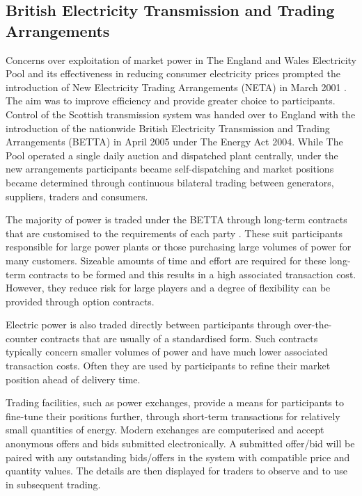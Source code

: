 \subsection{British Electricity Transmission and Trading Arrangements}
\label{sec:betta}
Concerns over exploitation of market power in The England and Wales Electricity
Pool and its effectiveness in reducing consumer electricity prices prompted the
introduction of New Electricity Trading Arrangements (NETA) in March 2001
\cite{martoccia:2005}.  The aim was to improve efficiency and provide greater
choice to participants.  Control of the Scottish transmission system was
handed over to England with the introduction of the nationwide British
Electricity Transmission and Trading Arrangements (BETTA) in April 2005 under
The Energy Act 2004.  While The Pool operated a single daily auction and dispatched plant
centrally, under the new arrangements participants became self-dispatching and
market positions became determined through continuous bilateral trading
between generators, suppliers, traders and consumers.

The majority of power is traded under the BETTA through long-term contracts
that are customised to the requirements of each party \cite{kirschen:book}.
These suit participants responsible for large power plants or those purchasing
large volumes of power for many customers.  Sizeable amounts of time and
effort are required for these long-term contracts to be formed and this results
in a high associated transaction cost.  However, they reduce risk for large
players and a degree of flexibility can be provided through option contracts.

Electric power is also traded directly between participants through
over-the-counter contracts that are usually of a standardised form.  Such contracts
typically concern smaller volumes of power and have much lower associated
transaction costs.  Often they are used by participants to refine their market
position ahead of delivery time.

Trading facilities, such as power exchanges, provide a means for participants
to fine-tune their positions further, through short-term transactions for
relatively small quantities of energy.  Modern exchanges are computerised and
accept anonymous offers and bids submitted electronically.  A submitted
offer/bid will be paired with any outstanding bids/offers in the system with
compatible price and quantity values.  The details are then displayed for
traders to observe and to use in subsequent trading.

